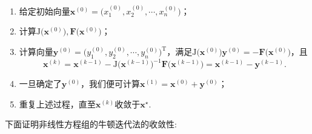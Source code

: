 \documentclass[cn,12pt,founder,a4paper]{elegantpaper}
\newcommand*{\transpose}{\mathrm{T}}
\newcommand*{\J}{\b{\mathrm{J}}}
\renewcommand*{\emph}[1]{{\heiti{#1}}}
\renewcommand*{\b}{\boldsymbol}
\begin{document}
\begin{enumerate}
  \item[\emph{步一}]
  给定初始向量\(\b{x}^{(0)}=\big(x_1^{(0)},x_2^{(0)},\cdots,x_n^{(0)}\big)\)；
  \item[\emph{步二}]
  计算\(\J\big(\b{x}^{(0)}\big),\b{F}\big(\b{x}^{(0)}\big)\)；
  \item[\emph{步三}]
  计算向量\(\b{y}^{(0)}=\big(y_1^{(0)},y_2^{(0)},\cdots,y_n^{(0)}\big)^\transpose\)，满足\(\J\big(\b{x}^{(0)}\big)\b{y}^{(0)}=-\b{F}\big(\b{x}^{(0)}\big)\)，且
  \[\b{x}^{(k)}=\b{x}^{(k-1)}-\J\big(\b{x}^{(k-1)}\big)^{-1}\b{F}\big(\b{x}^{(k-1)}\big)=\b{x}^{(k-1)}-\b{y}^{(k-1)}.\]
  \item[\emph{步四}]
  一旦确定了\(\b{y}^{(0)}\)，我们便可计算\(\b{x}^{(1)}=\b{x}^{(0)}+\b{y}^{(0)}\)；
  \item[\emph{步五}]  
  重复上述过程，直至\(\b{x}^{(k)}\)收敛于\(\b{x}^\star\).
\end{enumerate}
下面证明非线性方程组的牛顿迭代法的收敛性:
\end{document}

